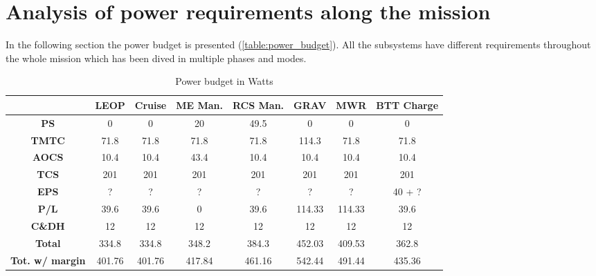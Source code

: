 \section{Analysis of power requirements along the mission}
\label{sec:EPS_phases}

In the following section the power budget is presented (\autoref{table:power_budget}). All the subsystems have different requirements throughout the whole mission which has been dived in multiple phases and modes. 
\begin{table}[H]
    \renewcommand{\arraystretch}{1.5}
    \centering
    \begin{tabular}{|c|c|c|c|c|c|c|c|}
        \hline
        & \textbf{LEOP} & \textbf{Cruise} & \textbf{ME Man.} & \textbf{RCS Man.} & \textbf{GRAV} & \textbf{MWR} & \textbf{BTT Charge} \\
        \hline
        \hline
        \textbf{PS} & 0 & 0 & 20 & 49.5 & 0 & 0 & 0 \\
        \hline
        \textbf{TMTC} & 71.8 & 71.8 & 71.8 & 71.8 & 114.3 & 71.8 & 71.8 \\
        \hline
        \textbf{AOCS} & 10.4 & 10.4 & 43.4 & 10.4 & 10.4 & 10.4 & 10.4 \\
        \hline
        \textbf{TCS} & 201 & 201 & 201 & 201 & 201 & 201 & 201 \\
        \hline
        \textbf{EPS} & ? & ? & ? & ? & ? & ? & 40 + ? \\
        \hline
        \textbf{P/L} & 39.6 & 39.6 & 0 & 39.6 & 114.33 & 114.33 & 39.6 \\
        \hline
        \textbf{C\&DH} & 12 & 12 & 12 & 12 & 12 & 12 & 12 \\
        \hline
        \hline
        \textbf{Total} & 334.8 & 334.8 & 348.2 & 384.3 & 452.03 & 409.53 & 362.8 \\
        \hline
        \textbf{Tot. w/ margin} & 401.76 & 401.76 & 417.84 & 461.16 & 542.44 & 491.44 & 435.36 \\
        \hline
    \end{tabular}
    \caption{Power budget in Watts}
    \label{table:power_budget}
\end{table}  

